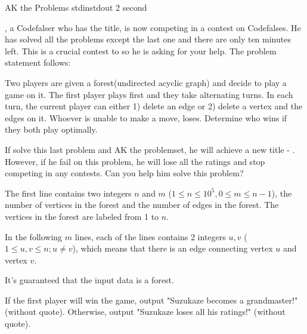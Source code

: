 
\begin{problem}{AK the Problems}
{stdin}{stdout}
{2 second}{}{}

\Suzukaze, a Codefalser who has the \master title, is now competing in a contest on Codefalses. He has solved all the problems except the last one and there are only ten minutes left. This is a crucial contest to \Suzukaze so he is asking for your help. The problem statement follows:

\par
Two players are given a forest(undirected acyclic graph) and decide to play a game on it. The first player plays first and they take alternating turns. In each turn, the current player can either 1) delete an edge or 2) delete a vertex and the edges on it. Whoever is unable to make a move, loses. Determine who wins if they both play optimally.

\par
If \Suzukaze  solve this last problem and AK the problemset, he will achieve a new title - \grandmaster. However, if he fail on this problem, he will lose all the ratings and stop competing in any contests. Can you help him solve this problem?

\InputFile

The first line contains two integers $n$ and $m$ ($1 \le n \le 10^5,0 \le m \le n-1 $), the number of vertices in the forest and the number of edges in the forest. The vertices in the forest are labeled from 1 to $n$.

In the following $m$ lines, each of the lines contains 2 integers $u, v$ ($1 \le u,v \le n; u \neq v$), which means that there is an edge connecting vertex $u$ and vertex $v$.

It's guaranteed that the input data is a forest.

\OutputFile

If the first player will win the game, output "Suzukaze becomes a grandmaster!" (without quote). Otherwise, output "Suzukaze loses all his ratings!" (without quote).

\Examples

\begin{example}
%
\end{example}

\end{problem}
